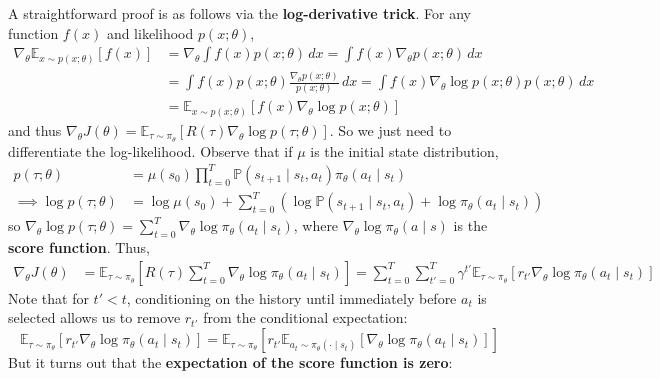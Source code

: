 \documentclass[11pt, letterpaper]{article}
\begin{document}
\begin{remark}
    A straightforward proof is as follows via the \textbf{log-derivative trick}. For any function \(f(x)\) and likelihood \(p(x; \theta)\), 
    \begin{align*}
        \nabla_{\theta} \mathbb{E}_{x \sim p(x; \theta)} [f(x)] &= \nabla_{\theta} \int f(x) p(x; \theta) \, dx 
        = \int f(x) \nabla_{\theta} p(x; \theta) \, dx \\
        &= \int f(x) p(x; \theta) \frac{\nabla_{\theta} p(x; \theta)}{p(x; \theta)} \, dx 
        = \int f(x) \nabla_{\theta} \log p(x; \theta) p(x; \theta) \, dx \\
        &= \mathbb{E}_{x \sim p(x; \theta)} [f(x) \nabla_{\theta} \log p(x; \theta)]
    \end{align*}
    and thus \(\nabla_\theta J(\theta) = \mathbb{E}_{\tau \sim \pi_\theta}[R(\tau)\nabla_\theta \log p(\tau; \theta)]\). So we just need to differentiate the log-likelihood. Observe that if \(\mu\) is the initial state distribution, 
    \begin{align*}
        p(\tau; \theta) &= \mu(s_0) \prod_{t=0}^T \mathbb{P}(s_{t+1} \mid s_t, a_t) \pi_\theta(a_t \mid s_t) \\
        \implies \log p(\tau; \theta) &= \log\mu(s_0) + \sum_{t=0}^T (\log\mathbb{P}(s_{t+1} \mid s_t, a_t) + \log \pi_{\theta}(a_t \mid s_t))
    \end{align*}
    so \(\nabla_\theta \log p(\tau; \theta) = \sum_{t=0}^T \nabla_\theta \log \pi_\theta(a_t \mid s_t)\), where \(\nabla_\theta \log \pi_\theta(a \mid s)\) is the \textbf{score function}. Thus, 
    \begin{align*}
        \nabla_\theta J(\theta)
        &= \mathbb{E}_{\tau \sim \pi_\theta} \left[ R(\tau) \sum_{t=0}^T \nabla_\theta \log \pi_\theta (a_t \mid s_t) \right]
        = \sum_{t=0}^T \sum_{t'=0}^T \gamma^{t'} \mathbb{E}_{\tau \sim \pi_\theta}[r_{t'} \nabla_\theta \log \pi_\theta(a_t \mid s_t)]
    \end{align*}
    Note that for \(t' < t\), conditioning on the history until immediately before \(a_t\) is selected allows us to remove \(r_{t'}\) from the conditional expectation: 
    \[
        \mathbb{E}_{\tau \sim \pi_\theta} [r_{t'} \nabla_\theta \log \pi_\theta(a_t \mid s_t)]
        = \mathbb{E}_{\tau \sim \pi_\theta} [r_{t'} \mathbb{E}_{a_t \sim \pi_\theta(\cdot \mid s_t)}[\nabla_\theta \log \pi_\theta(a_t \mid s_t)]]
    \]
    But it turns out that the \textbf{expectation of the score function is zero}:
    \begin{align*}

\end{align*}
\end{remark}
\end{document}
